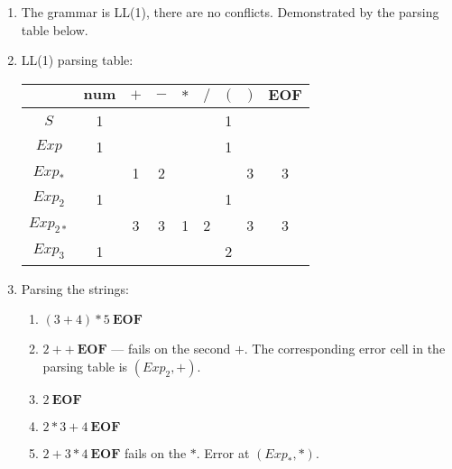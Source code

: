 \begin{exercise}{}
\begin{solution}
\begin{enumerate}
\begin{enumerate}
        \end{enumerate}
      \item The grammar is LL(1), there are no conflicts. Demonstrated by the
      parsing table below.
      \item LL(1) parsing table:
        \begin{center}
          \begin{tabular}{c|c|c|c|c|c|c|c|c}
            & \(\mathbf{num}\) & \(+\) & \(-\) & \(*\) & \(/\) & \((\) & \()\) & \(\mathbf{EOF}\) \\
            \hline
            \(S\) & 1 & & & & & 1 & &\\
            \(Exp\) & 1 & & & & & 1 & &\\
            \(Exp_*\) & & 1 & 2 & & & & 3 & 3 \\
            \(Exp_2\) & 1 & & & & & 1 & & \\
            \(Exp_{2*}\) & & 3 & 3 & 1 & 2 & & 3 & 3 \\
            \(Exp_3\) & 1 & & & & & 2 & & \\
          \end{tabular}
        \end{center}
      \item Parsing the strings:
      \begin{enumerate}
        \item \((3 + 4) * 5 ~\mathbf{EOF}\) \checkmark
        \item \(2 + + ~\mathbf{EOF}\) --- fails on the second \(+\). The
        corresponding error cell in the parsing table is \((Exp_2, +)\).
        \item \(2 ~\mathbf{EOF}\) \checkmark
        \item \(2 * 3 + 4 ~\mathbf{EOF}\) \checkmark
        \item \(2 + 3 * 4 ~\mathbf{EOF}\) fails on the \(*\). Error at \((Exp_*, *)\).
      \end{enumerate}


\end{enumerate}
\end{solution}
\end{exercise}

